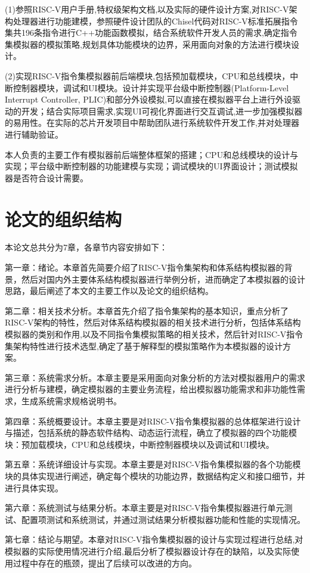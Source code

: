 (1)参照RISC-V用户手册,特权级架构文档,以及实际的硬件设计方案,对RISC-V架构处理器进行功能建模，参照硬件设计团队的Chisel代码对RISC-V标准拓展指令集共196条指令进行C++功能函数模拟，结合系统软件开发人员的需求,确定指令集模拟器的模拟策略,规划具体功能模块的边界，采用面向对象的方法进行模块设计。


(2)实现RISC-V指令集模拟器前后端模块,包括预加载模块，CPU和总线模块，中断控制器模块，调试和UI模块。设计并实现平台级中断控制器(Platform-Level Interrupt Controller, PLIC)和部分外设模拟,可以直接在模拟器平台上进行外设驱动的开发；结合实际项目需求,实现UI可视化界面进行交互调试,进一步加强模拟器的易用性。在实际的芯片开发项目中帮助团队进行系统软件开发工作,并对处理器进行辅助验证。


本人负责的主要工作有模拟器前后端整体框架的搭建；CPU和总线模块的设计与实现；平台级中断控制器的功能建模与实现；调试模块的UI界面设计；测试模拟器是否符合设计需要。


\section{论文的组织结构}
本论文总共分为7章，各章节内容安排如下：


第一章：绪论。本章首先简要介绍了RISC-V指令集架构和体系结构模拟器的背景，然后对国内外主要体系结构模拟器进行举例分析，进而确定了本模拟器的设计思路，最后阐述了本文的主要工作以及论文的组织结构。


第二章：相关技术分析。本章首先介绍了指令集架构的基本知识，重点分析了RISC-V架构的特性，然后对体系结构模拟器的相关技术进行分析，包括体系结构模拟器的类别和作用,以及不同指令集模拟策略的相关技术，然后针对RISC-V指令集架构特性进行技术选型,确定了基于解释型的模拟策略作为本模拟器的设计方案。


第三章：系统需求分析。本章主要是采用面向对象分析的方法对模拟器用户的需求进行分析与建模，确定模拟器的主要业务流程，给出模拟器功能需求和非功能性需求，生成系统需求规格说明书。


第四章：系统概要设计。本章主要是对RISC-V指令集模拟器的总体框架进行设计与描述，包括系统的静态软件结构、动态运行流程，确立了模拟器的四个功能模块：预加载模块，CPU和总线模块，中断控制器模块以及调试和UI模块。


第五章：系统详细设计与实现。本章主要是对RISC-V指令集模拟器的各个功能模块的具体实现进行阐述，确定每个模块的功能边界，数据结构定义和接口细节，并进行具体实现。


第六章：系统测试与结果分析。本章主要是对RISC-V指令集模拟器进行单元测试、配置项测试和系统测试，并通过测试结果分析模拟器功能和性能的实现情况。


第七章：结论与期望。本章对RISC-V指令集模拟器的设计与实现过程进行总结,对模拟器的实际使用情况进行介绍,最后分析了模拟器设计存在的缺陷，以及实际使用过程中存在的瓶颈，提出了后续可以改进的方向。


